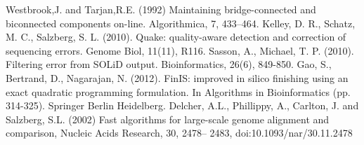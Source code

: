 \documentclass[11pt]{article}
\begin{document}
\begin{thebibliography}{widest entry}
   Westbrook,J. and Tarjan,R.E. (1992) Maintaining
    bridge-connected and biconnected components on-line. Algorithmica, 7,
    433–464.
   Kelley, D. R., Schatz, M. C., Salzberg, S. L. (2010). Quake:
    quality-aware detection and correction of sequencing errors. Genome Biol,
    11(11), R116.
   Sasson, A., Michael, T. P. (2010). Filtering error
    from SOLiD output. Bioinformatics, 26(6), 849-850.
   Gao, S., Bertrand, D., Nagarajan, N. (2012). FinIS: improved
    in silico finishing using an exact quadratic programming formulation. In
    Algorithms in Bioinformatics (pp. 314-325). Springer Berlin Heidelberg.
   Delcher, A.L., Phillippy, A., Carlton, J. and Salzberg, S.L.
    (2002) Fast algorithms for large-scale genome alignment and comparison,
    Nucleic Acids Research, 30, 2478– 2483, doi:10.1093/nar/30.11.2478
\end{thebibliography}
\end{document}

